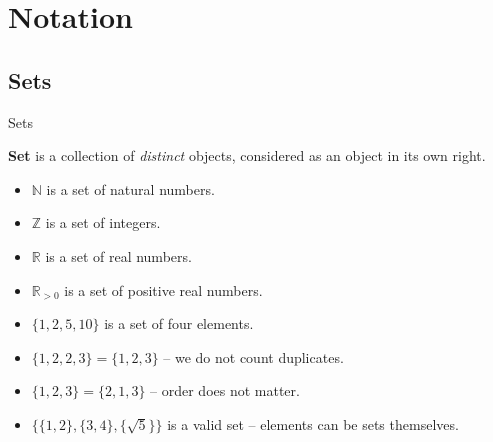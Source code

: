 \documentclass{beamer}
\begin{document}
    \section{Notation}

    \subsection{Sets}

    \begin{frame}{Sets}
      \begin{definition}
        \textbf{Set} is a collection of \textit{distinct} objects, considered as an object in its own right.
      \end{definition}

      \begin{example}
        \begin{itemize}
          \item $\mathbb{N}$ is a set of natural numbers.
          \item $\mathbb{Z}$ is a set of integers.
          \item $\mathbb{R}$ is a set of real numbers.
          \item $\mathbb{R}_{>0}$ is a set of positive real numbers.
          \item $\{1, 2, 5, 10\}$ is a set of four elements.
          \item $\{1, 2, 2, 3\} = \{1,2,3\}$ -- we do not count duplicates.
          \item $\{1,2,3\} = \{2,1,3\}$ -- order does not matter.
          \item $\{\{1,2\},\{3,4\}, \{\sqrt{5}\}\}$ is a valid set -- elements can be sets themselves.
        \end{itemize}
      \end{example}
    \end{frame}
\end{document}
